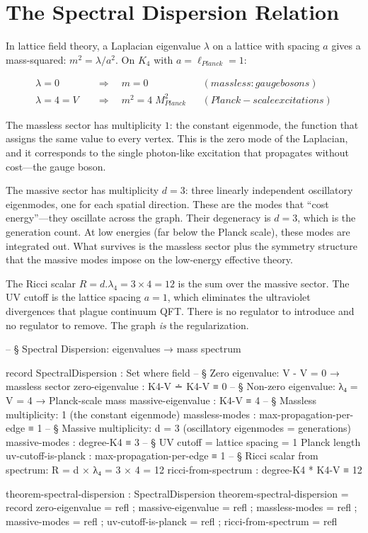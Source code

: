 \documentclass[11pt,a4paper]{book}
\def\cdot{.}%
\def\text#1{#1}%
\begin{document}
\section{The Spectral Dispersion Relation}
\label{sec:spectral-dispersion}

In lattice field theory, a Laplacian eigenvalue $\lambda$ on a lattice with spacing $a$ gives a mass-squared: $m^2 = \lambda / a^2$. On $K_4$ with $a = \ell_{\text{Planck}} = 1$:

\begin{align}
  \lambda = 0 \quad &\Longrightarrow \quad m = 0 && \text{(massless: gauge bosons)} \\
  \lambda = 4 = V \quad &\Longrightarrow \quad m^2 = 4 \; M_{\text{Planck}}^2 && \text{(Planck-scale excitations)}
\end{align}

The massless sector has multiplicity $1$: the constant eigenmode, the function that assigns the same value to every vertex. This is the zero mode of the Laplacian, and it corresponds to the single photon-like excitation that propagates without cost---the gauge boson.

The massive sector has multiplicity $d = 3$: three linearly independent oscillatory eigenmodes, one for each spatial direction. These are the modes that ``cost energy''---they oscillate across the graph. Their degeneracy is $d = 3$, which is the generation count. At low energies (far below the Planck scale), these modes are integrated out. What survives is the massless sector plus the symmetry structure that the massive modes impose on the low-energy effective theory.

The Ricci scalar $R = d \cdot \lambda_4 = 3 \times 4 = 12$ is the sum over the massive sector. The UV cutoff is the lattice spacing $a = 1$, which eliminates the ultraviolet divergences that plague continuum QFT. There is no regulator to introduce and no regulator to remove. The graph \emph{is} the regularization.

\begin{code}
-- § Spectral Dispersion: eigenvalues → mass spectrum

record SpectralDispersion : Set where
  field
    -- § Zero eigenvalue: V - V = 0 → massless sector
    zero-eigenvalue     : K4-V ∸ K4-V ≡ 0
    -- § Non-zero eigenvalue: λ₄ = V = 4 → Planck-scale mass
    massive-eigenvalue  : K4-V ≡ 4
    -- § Massless multiplicity: 1 (the constant eigenmode)
    massless-modes      : max-propagation-per-edge ≡ 1
    -- § Massive multiplicity: d = 3 (oscillatory eigenmodes = generations)
    massive-modes       : degree-K4 ≡ 3
    -- § UV cutoff = lattice spacing = 1 Planck length
    uv-cutoff-is-planck : max-propagation-per-edge ≡ 1
    -- § Ricci scalar from spectrum: R = d × λ₄ = 3 × 4 = 12
    ricci-from-spectrum : degree-K4 * K4-V ≡ 12

theorem-spectral-dispersion : SpectralDispersion
theorem-spectral-dispersion = record
  { zero-eigenvalue     = refl
  ; massive-eigenvalue  = refl
  ; massless-modes      = refl
  ; massive-modes       = refl
  ; uv-cutoff-is-planck = refl
  ; ricci-from-spectrum = refl }
\end{code}
\end{document}
